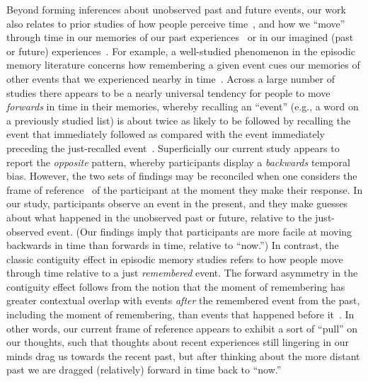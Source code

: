 \documentclass[10pt]{article}
\begin{document}
Beyond forming inferences about unobserved past and future events, our work also relates to prior studies of how people perceive time~\citep{BlocGrub14, Howa18, Eagl08, IvrySchl08, Wear16}, and how we ``move'' through time in our memories of our past experiences~\citep{Mann21a, MannEtal11, HowaEtal12, MannEtal07, ShanHowa12, Kaha96, PolyKaha08, SchaTulv94} or in our imagined (past or future) experiences~\citep{Scha12, JossTone20, SchaEtal98, MomeHowa18}. For example, a well-studied phenomenon in the episodic memory literature concerns how remembering a given event cues our memories of other events that we experienced nearby in time~\citep[i.e., the \textit{contiguity effect};][]{Kaha96}. Across a large number of studies there appears to be a nearly universal tendency for people to move \textit{forwards} in time in their memories, whereby recalling an ``event'' (e.g., a word on a previously studied list) is about twice as likely to be followed by recalling the event that immediately followed as compared with the event immediately preceding the just-recalled event~\citep{HealKaha14a}. Superficially our current study appears to report the \textit{opposite} pattern, whereby participants display a \textit{backwards} temporal bias. However, the two sets of findings may be reconciled when one considers the frame of reference~\citep[and current mental context; e.g.,][]{HowaKaha02a} of the participant at the moment they make their response. In our study, participants observe an event in the present, and they make guesses about what happened in the unobserved past or future, relative to the just-observed event. (Our findings imply that participants are more facile at moving backwards in time than forwards in time, relative to ``now.'') In contrast, the classic contiguity effect in episodic memory studies refers to how people move through time relative to a just \textit{remembered} event. The forward asymmetry in the contiguity effect follows from the notion that the moment of remembering has greater contextual overlap with events \textit{after} the remembered event from the past, including the moment of remembering, than events that happened before it~\citep[for review also see ][]{MannEtal15, Mann20}.  In other words, our current frame of reference appears to exhibit a sort of ``pull'' on our thoughts, such that thoughts about recent experiences still lingering in our minds drag us towards the recent past, but after thinking about the more distant past we are dragged (relatively) forward in time back to ``now.''
\end{document}
